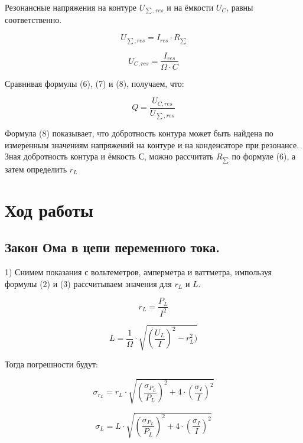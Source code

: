 Резонансные напряжения на контуре $U_{\sum, res}$  и на ёмкости $U_C$,
равны соответственно.

\begin{equation}\label{}
U_{\sum, res} = I_{res}\cdot R_{\sum}
\end{equation}

\begin{equation}\label{}
U_{C,res} = \frac{I_{res}}{\Omega \cdot C}
\end{equation}

Сравнивая формулы (6), (7) и (8), получаем, что:


\begin{equation}\label{}
Q = \frac{U_{C, res}}{U_{\sum, res}}
\end{equation}

Формула (8) показывает, что добротность контура может быть найдена по измеренным значениям напряжений на контуре и на конденсаторе при резонансе. Зная добротность контура и ёмкость С, можно рассчитать $R_{\sum}$ по формуле (6), а затем определить $r_L$


\section{Ход работы}
\subsection{Закон Ома в цепи переменного тока.}

1) Снимем показания с вольтеметров, амперметра и ваттметра, импользуя формулы (2) и (3) рассчитываем значения для $  r_{L}$ и $ L $.

\begin{equation}\label{}
r_L = \frac{P_L}{I^2}
\end{equation}

\begin{equation}\label{}
L = \frac{1}{\Omega}\cdot\sqrt{\left(\frac{U_L}{I}\right)^2 - r_L^2)}
\end{equation}

Тогда погрешности будут:

\begin{equation}\label{}
\sigma_{r_L} = r_L \cdot \sqrt{(\frac{\sigma_{P_L}}{P_L})^2 + 4\cdot(\frac{\sigma_I}{I})^2}
\end{equation}

\begin{equation}\label{}
\sigma_{L} = L \cdot \sqrt{(\frac{\sigma_{P_L}}{P_L})^2 + 4\cdot(\frac{\sigma_I}{I})^2}
\end{equation}



